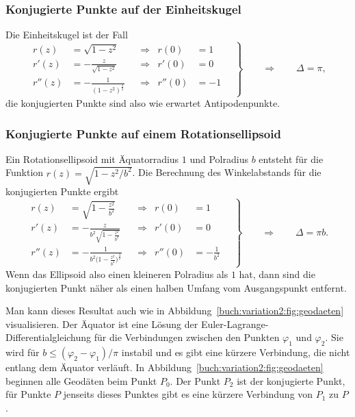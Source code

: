 \subsubsection{Konjugierte Punkte auf der Einheitskugel}
Die Einheitskugel ist der Fall
\begin{equation}
\left.
\begin{aligned}
r(z)
&=
\sqrt{1-z^2}
&&\Rightarrow&
r(0)&=1
\\
r'(z)
&=
-
\frac{z}{\sqrt{1-z^2}}
&&\Rightarrow&
r'(0)&=0
\\
r''(z)
&=
-
\frac{1}{(1-z^2)^{\frac32}}
&&\Rightarrow&
r''(0)&=-1
\end{aligned}
\quad
\right\}
\qquad\Rightarrow\qquad
\Delta
=
\pi,
\end{equation}
die konjugierten Punkte sind also wie erwartet Antipodenpunkte.

%
%
\subsubsection{Konjugierte Punkte auf einem Rotationsellipsoid}
Ein Rotationsellipsoid mit Äquatorradius $1$ und Polradius $b$
entsteht für die Funktion $r(z)=\sqrt{1-z^2/b^2}$.
Die Berechnung des Winkelabstands für die konjugierten Punkte
ergibt
\begin{equation}
\left.
\begin{aligned}
r(z) &= \sqrt{1-\frac{z^2}{b^2}}
&&\Rightarrow&
r(0) &= 1
\\
r'(z) &= -\frac{z}{\displaystyle b^2\sqrt{1-\frac{z^2}{b^2}}}
&&\Rightarrow&
r'(0) &= 0
\\
r''(z)
&=
-\frac{1}{b^2\biggl(\displaystyle1-\frac{z^2}{b^2}\biggr)^{\frac32}}
&&\Rightarrow&
r''(0) &= -\frac{1}{b^2}
\end{aligned}
\quad
\right\}
\qquad\Rightarrow\qquad
\Delta
=
\pi b.
\end{equation}
Wenn das Ellipsoid also einen kleineren Polradius als $1$ hat, dann
sind die konjugierten Punkt näher als einen halben Umfang vom
Ausgangspunkt entfernt.

Man kann dieses Resultat auch wie in
Abbildung~\ref{buch:variation2:fig:geodaeten} visualisieren.
%
Der Äquator ist eine Lösung der Euler-Lagrange-Differentialgleichung
für die Verbindungen zwischen den Punkten $\varphi_1$ und $\varphi_2$.
Sie wird für $b \le (\varphi_2-\varphi_1)/\pi$ instabil und es gibt
eine kürzere Verbindung, die nicht entlang dem Äquator verläuft.
In Abbildung~\ref{buch:variation2:fig:geodaeten} beginnen alle
Geodäten beim Punkt $P_0$.
Der Punkt $P_2$ ist der konjugierte Punkt, für Punkte $P$ jenseits dieses
Punktes gibt es eine kürzere Verbindung von $P_1$ zu $P$.


